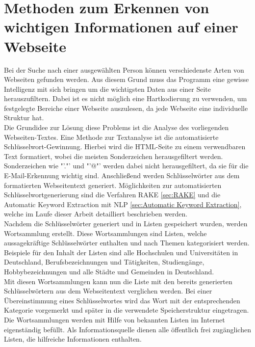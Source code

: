 \section{Methoden zum Erkennen von wichtigen Informationen auf einer Webseite}
\label{subsec:ErkennenVonInformation}
Bei der Suche nach einer ausgewählten Person können verschiedenste Arten von Webseiten gefunden werden. Aus diesem Grund muss das Programm eine gewisse Intelligenz mit sich bringen um die wichtigsten Daten aus einer Seite herauszufiltern. Dabei ist es nicht möglich eine Hartkodierung zu verwenden, um festgelegte Bereiche einer Webseite auszulesen, da jede Webseite eine individuelle Struktur hat.\\
Die Grundidee zur Lösung diese Problems ist die Analyse des vorliegenden Webseiten-Textes. Eine Methode zur Textanalyse ist die automatisierte Schlüsselwort-Gewinnung. Hierbei wird die HTML-Seite zu einem verwendbaren Text formatiert, wobei die meisten Sonderzeichen herausgefiltert werden. Sonderzeichen wie "'."' und "'@"' werden dabei nicht herausgefiltert, da sie für die E-Mail-Erkennung wichtig sind. Anschließend werden Schlüsselwörter aus dem formatierten Webseitentext generiert. Möglichkeiten zur automatisierten Schlüsselwortgenerierung sind die Verfahren RAKE \ref{sec:RAKE} und die Automatic Keyword Extraction mit NLP \ref{sec:Automatic Keyword Extraction}, welche im Laufe dieser Arbeit detailliert beschrieben werden.\\
Nachdem die Schlüsselwörter generiert und in Listen gespeichert wurden, werden Wortsammlung erstellt. Diese Wortsammlungen sind Listen, welche aussagekräftige Schlüsselwörter enthalten und nach Themen kategorisiert werden. Beispiele für den Inhalt der Listen sind alle Hochschulen und Universitäten in Deutschland, Berufsbezeichnungen und Tätigkeiten, Studiengänge, Hobbybezeichnungen und alle Städte und Gemeinden in Deutschland.\\
Mit diesen Wortsammlungen kann nun die Liste mit den bereits generierten Schlüsselwörtern aus dem Webseitentext verglichen werden. Bei einer Übereinstimmung eines Schlüsselwortes wird das Wort mit der entsprechenden Kategorie vorgemerkt und später in die verwendete Speicherstruktur eingetragen. \\
Die Wortsammlungen werden mit Hilfe von bekannten Listen im Internet eigenständig befüllt. Als Informationsquelle dienen alle öffentlich frei zugänglichen Listen, die hilfreiche Informationen enthalten.

